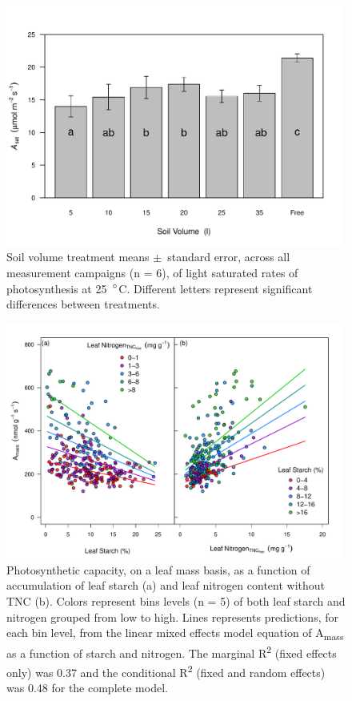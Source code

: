 \documentclass[a4paper]{article}\usepackage[]{graphicx}\usepackage[]{color}
\begin{document}
\begin{figure}[h!]
    \centering
    \includegraphics[width=0.99\textwidth]{Asat.pdf}
    \caption{Soil volume treatment means $\pm$~standard error, across all measurement campaigns (n = 6), of light saturated rates of photosynthesis at 25~$\degree$C. Different letters represent significant differences between treatments.}
    \label{fig:figure 2.4}
\end{figure}

\begin{figure}[h!]
    \centering
    \includegraphics[width=0.99\textwidth]{A_leafchem.pdf}
    \caption{Photosynthetic capacity, on a leaf mass basis, as a function of accumulation of leaf starch (a) and leaf nitrogen content without TNC (b). Colors represent bins levels (n = 5) of both leaf starch and nitrogen grouped from low to high.  Lines represents predictions, for each bin level, from the linear mixed effects model equation of A\textsubscript{mass} as a function of starch and nitrogen. The marginal R\textsuperscript{2} (fixed effects only) was 0.37 and the conditional R\textsuperscript{2} (fixed and random effects) was 0.48 for the complete model.}
    \label{fig:figure 2.5}
\end{figure}
\end{document}

